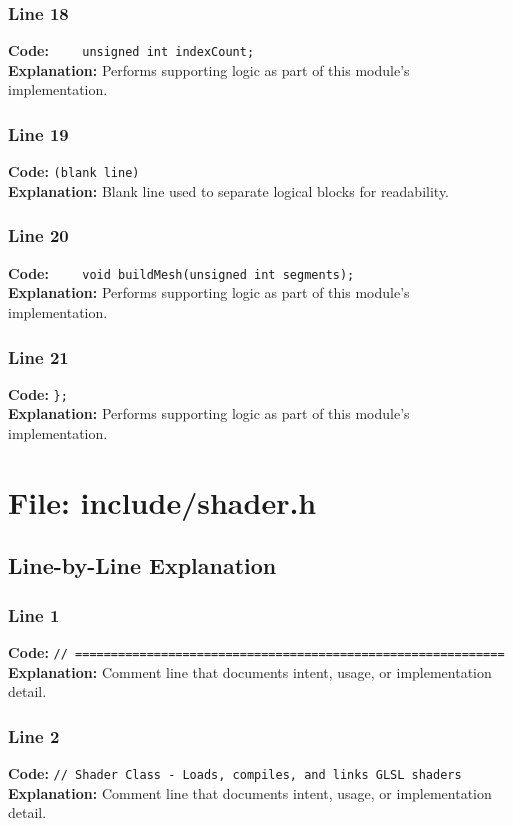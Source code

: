 \documentclass[11pt,a4paper]{article}
\begin{document}
\subsubsection*{Line 18}
\textbf{Code:} \verb|    unsigned int indexCount;|\\
\textbf{Explanation:} Performs supporting logic as part of this module's implementation.

\subsubsection*{Line 19}
\textbf{Code:} \texttt{(blank line)}\\
\textbf{Explanation:} Blank line used to separate logical blocks for readability.

\subsubsection*{Line 20}
\textbf{Code:} \verb|    void buildMesh(unsigned int segments);|\\
\textbf{Explanation:} Performs supporting logic as part of this module's implementation.

\subsubsection*{Line 21}
\textbf{Code:} \verb|};|\\
\textbf{Explanation:} Performs supporting logic as part of this module's implementation.

\newpage
\section{File: include/shader.h}
\subsection{Line-by-Line Explanation}
\subsubsection*{Line 1}
\textbf{Code:} \verb|// ============================================================|\\
\textbf{Explanation:} Comment line that documents intent, usage, or implementation detail.

\subsubsection*{Line 2}
\textbf{Code:} \verb|// Shader Class - Loads, compiles, and links GLSL shaders|\\
\textbf{Explanation:} Comment line that documents intent, usage, or implementation detail.
\end{document}
